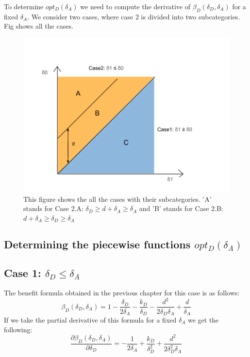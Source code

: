 To determine $opt_{D}(\delta_{A})$ we need to compute the derivative of  $\beta_{D}(\delta_{D},\delta_{A}) $ for a fixed $\delta_{A}$.
 We consider two cases, where case 2 is divided into two subcategories. Fig  shows all the cases.\\
\begin{figure}[hbtp]
\centering
\includegraphics[scale=0.4]{Images/bestresp.png}
\caption{This figure shows the all the cases with their subcategories. 'A' stands for Case 2.A: $\delta_{D} \geq d+\delta_{A} \geq \delta_{A}$ and 'B' stands for Case 2.B: $d+\delta_{A} \geq \delta_{D} \geq  \delta_{A} $ }
\label{grafiekbestr}
\end{figure}

\subsection{Determining the piecewise functions $opt_{D}(\delta_{A})$}


\subsection*{Case 1: $\delta_{D} \leq \delta_{A} $}
The benefit formula obtained in the previous chapter for this case is as follows:
\begin{equation*}
\beta_{D}(\delta_{D},\delta_{A}) = 1 - \dfrac{\delta_{D}}{2\delta_{A}} - \dfrac{k_{D}}{\delta_{D}} - \dfrac{d^{2}}{2\delta_{D}\delta_{A}} + \dfrac{d}{\delta_{A}}
\end{equation*}
If we take the partial derivative of this formula for a fixed $\delta_{A}$ we get the following:
\begin{equation*}\label{formdelta}
\frac{\partial \beta_{D}(\delta_{D},\delta_{A})}{\partial \delta_{D}} = - \dfrac{1}{2\delta_{A}} + \dfrac{k_{D}}{\delta_{D}^{2}} + \dfrac{d^{2}}{2\delta_{D}^{2}\delta_{A}}
\end{equation*}

